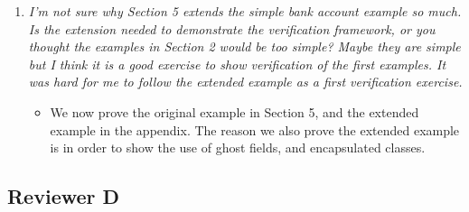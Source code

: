 \documentclass[11pt]{amsart}
\begin{document}
\begin{enumerate}
\item
\emph{
I'm not sure why Section 5 extends the simple bank account example so much. Is the extension needed to demonstrate the verification framework, or you thought the examples in Section 2 would be too simple? Maybe they are simple but I think it is a good exercise to show verification of the first examples. It was hard for me to follow the extended example as a first verification exercise.}
\begin{itemize}
\item  
We now prove  the original example in Section 5, and the extended example in the appendix. The reason we also prove the extended example is in order to show the use of ghost fields, and encapsulated classes.
\end{itemize}

\end{enumerate}
 
 
 \subsection{Reviewer D}

 
\end{document}
